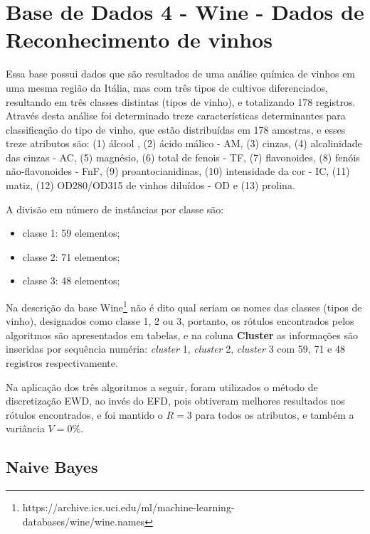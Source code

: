 

\section{Base de Dados 4 - Wine - Dados de Reconhecimento de vinhos}

Essa base \cite{Aeberhard1992} possui dados que são resultados de uma análise química de vinhos em uma mesma região da Itália, mas com três tipos de cultivos diferenciados, resultando em três classes distintas (tipos de vinho), e totalizando 178 registros. Através desta análise foi determinado treze características determinantes para classificação do tipo de vinho, que estão distribuídas em 178 amostras, e  esses treze atributos são: (1) álcool , (2) ácido málico - AM, (3) cinzas, (4) alcalinidade das cinzas - AC, (5) magnésio, (6) total de fenois - TF, (7) flavonoides, (8) fenóis não-flavonoides - FnF, (9) proantocianidinas, (10) intensidade da cor - IC, (11) matiz, (12) OD280/OD315 de vinhos diluídos - OD e (13) prolina.

A divisão em número de instâncias por classe são:

\begin{itemize}[noitemsep]
 \item classe 1: 59 elementos;
 \item classe 2: 71 elementos;
 \item classe 3: 48 elementos;
\end{itemize}

Na descrição da base Wine\footnote{https://archive.ics.uci.edu/ml/machine-learning-databases/wine/wine.names} não é dito qual seriam os nomes das classes (tipos de vinho), designados como classe 1, 2 ou 3, portanto, os rótulos encontrados pelos algoritmos são apresentados em tabelas, e na coluna \textbf{Cluster} as informações são inseridas por sequência numéria: \textit{cluster} 1, \textit{cluster} 2, \textit{cluster} 3 com 59, 71 e 48 registros respectivamente.

Na aplicação dos três algoritmos a seguir, foram  utilizados o método de discretização EWD, ao invés do EFD, pois obtiveram melhores resultados nos rótulos encontrados, e foi mantido o ${R=3}$ para todos os atributos, e também a variância ${V=0\%}$.

\subsection{Naive Bayes} \label{cap:resultados:ssec:wine:bayes}

